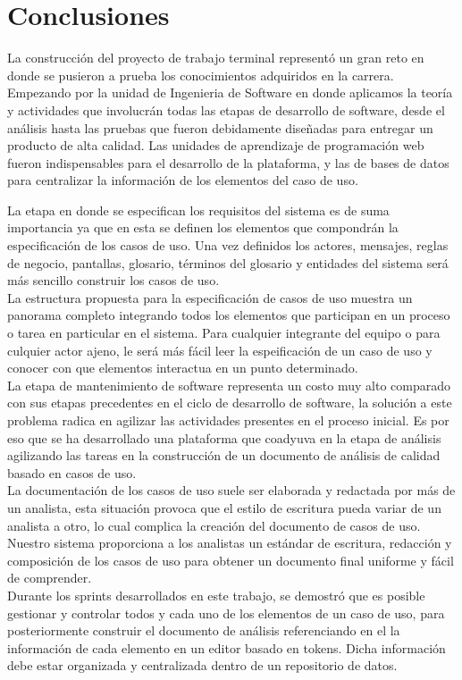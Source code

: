 \chapter{Conclusiones} \label{cap:diez}

La construcción del proyecto de trabajo terminal representó un gran reto en donde se pusieron a prueba los conocimientos adquiridos en la carrera. Empezando por la unidad de Ingenieria de Software en donde aplicamos la teoría y actividades que involucrán todas las etapas de desarrollo de software, desde el análisis hasta las pruebas que fueron debidamente diseñadas para entregar un producto de alta calidad. Las unidades de aprendizaje de programación web fueron indispensables para el desarrollo de la plataforma, y las de bases de datos para centralizar la información de los elementos del caso de uso.

La etapa en donde se especifican los requisitos del sistema es de suma importancia ya que en esta se definen los elementos que compondrán la especificación de los casos de uso. Una vez definidos los actores, mensajes, reglas de negocio, pantallas, glosario, términos del glosario y entidades del sistema será más sencillo construir los casos de uso.\\

La estructura propuesta para la especificación de casos de uso muestra un panorama completo integrando todos los elementos que participan en un proceso o tarea en particular en el sistema. Para cualquier integrante del equipo o para culquier actor ajeno, le será más fácil leer la espeificación de un caso de uso y conocer con que elementos interactua en un punto determinado.\\

La etapa de mantenimiento de software representa un costo muy alto comparado con sus etapas precedentes en el ciclo de desarrollo de software, la solución a este problema radica en agilizar las actividades presentes en el proceso inicial. Es por eso que se ha desarrollado una plataforma que coadyuva en la etapa de análisis agilizando las tareas en la construcción de un documento de análisis de calidad basado en casos de uso.\\

La documentación de los casos de uso suele ser elaborada y redactada por más de un analista, esta situación provoca que el estilo de escritura pueda variar de un analista a otro, lo cual complica la creación del documento de casos de uso. Nuestro sistema proporciona a los analistas un estándar de escritura, redacción y composición de los casos de uso para obtener un documento final uniforme y fácil de comprender.\\

Durante los sprints desarrollados en este trabajo, se demostró que es posible gestionar y controlar todos y cada uno de los elementos de un caso de uso, para posteriormente construir el documento de análisis referenciando en el la información de cada elemento en un editor basado en tokens. Dicha información debe estar organizada y centralizada dentro de un repositorio de datos.\\

